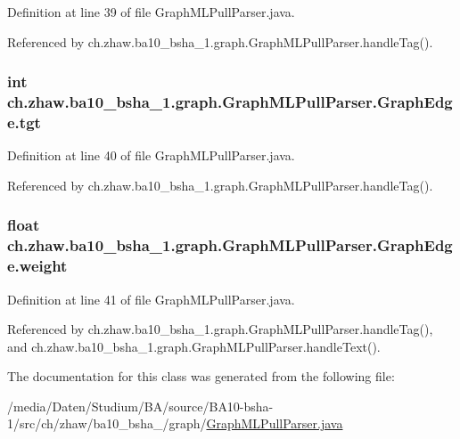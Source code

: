 Definition at line 39 of file GraphMLPullParser.java.

Referenced by ch.zhaw.ba10\_\-bsha\_\-1.graph.GraphMLPullParser.handleTag().\hypertarget{classch_1_1zhaw_1_1ba10__bsha__1_1_1graph_1_1GraphMLPullParser_1_1GraphEdge_ab4607327cafc0923bb9b5d0ca34abe1e}{
\subsubsection[{tgt}]{\setlength{\rightskip}{0pt plus 5cm}int {\bf ch.zhaw.ba10\_\-bsha\_\-1.graph.GraphMLPullParser.GraphEdge.tgt}}}
\label{classch_1_1zhaw_1_1ba10__bsha__1_1_1graph_1_1GraphMLPullParser_1_1GraphEdge_ab4607327cafc0923bb9b5d0ca34abe1e}


Definition at line 40 of file GraphMLPullParser.java.

Referenced by ch.zhaw.ba10\_\-bsha\_\-1.graph.GraphMLPullParser.handleTag().\hypertarget{classch_1_1zhaw_1_1ba10__bsha__1_1_1graph_1_1GraphMLPullParser_1_1GraphEdge_ab07b6563dfd9148c9097f29edd1e5e03}{
\subsubsection[{weight}]{\setlength{\rightskip}{0pt plus 5cm}float {\bf ch.zhaw.ba10\_\-bsha\_\-1.graph.GraphMLPullParser.GraphEdge.weight}}}
\label{classch_1_1zhaw_1_1ba10__bsha__1_1_1graph_1_1GraphMLPullParser_1_1GraphEdge_ab07b6563dfd9148c9097f29edd1e5e03}


Definition at line 41 of file GraphMLPullParser.java.

Referenced by ch.zhaw.ba10\_\-bsha\_\-1.graph.GraphMLPullParser.handleTag(), and ch.zhaw.ba10\_\-bsha\_\-1.graph.GraphMLPullParser.handleText().

The documentation for this class was generated from the following file:\begin{DoxyCompactItemize}
\item 
/media/Daten/Studium/BA/source/BA10-\/bsha-\/1/src/ch/zhaw/ba10\_\-bsha\_/graph/\hyperlink{GraphMLPullParser_8java}{GraphMLPullParser.java}\end{DoxyCompactItemize}
